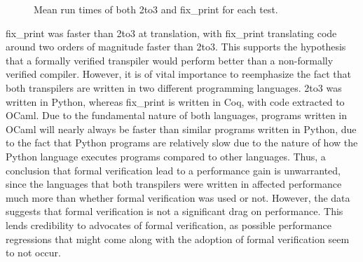 \begin{figure*}[ht]
    \caption{Mean run times of both 2to3 and fix_print for each test.}
\end{figure*}


fix\_print was faster than 2to3 at translation, with fix\_print translating code around two orders of magnitude faster than 2to3. This supports the hypothesis that a formally verified transpiler would perform better than a non-formally verified compiler. However, it is of vital importance to reemphasize the fact that both transpilers are written in two different programming languages. 2to3 was written in Python, whereas fix\_print is written in Coq, with code extracted to OCaml. Due to the fundamental nature of both languages, programs written in OCaml will nearly always be faster than similar programs written in Python, due to the fact that Python programs are relatively slow due to the nature of how the Python language executes programs compared to other languages. Thus, a conclusion that formal verification lead to a performance gain is unwarranted, since the languages that both transpilers were written in affected performance much more than whether formal verification was used or not. However, the data suggests that formal verification is not a significant drag on performance. This lends credibility to advocates of formal verification, as possible performance regressions that might come along with the adoption of formal verification seem to not occur.

